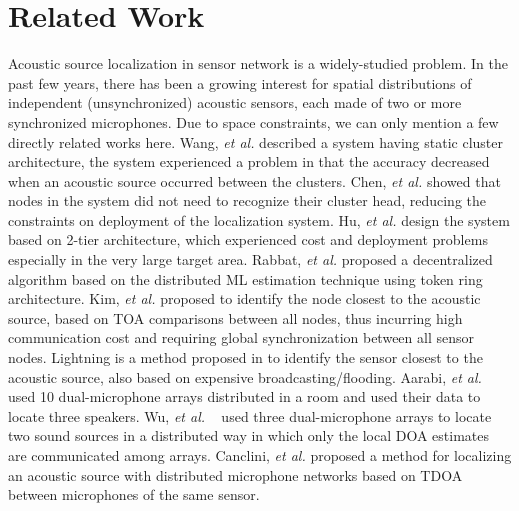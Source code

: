 \section{Related Work}

Acoustic source localization in sensor network is a widely-studied problem. 
In the past few years, there has been a growing interest for spatial distributions of independent (unsynchronized) acoustic sensors, each made of two or more synchronized microphones. Due to space constraints, we can only mention a few directly related works here.
Wang, \emph{et al.} \cite{wang2003acoustic} described a system having static cluster architecture, the system experienced a problem in that the accuracy decreased when an acoustic source occurred between the clusters.
Chen, \emph{et al.} \cite{chen2004dynamic} showed that nodes in the system did not need to recognize their cluster head, reducing the constraints on deployment of the localization system.
Hu, \emph{et al.} \cite{hu2009design} design the system based on 2-tier architecture, which experienced cost and deployment problems especially in the very large target area.
Rabbat, \emph{et al.} \cite{rabbat2005robust} proposed a decentralized algorithm based on the distributed ML estimation technique using token ring architecture.
Kim, \emph{et al.} \cite{kim2009locating}proposed to identify the node closest to the acoustic source, based on TOA comparisons between all nodes, thus incurring high communication cost and requiring global synchronization between all sensor nodes.
Lightning is a method proposed in \cite{wang2008lightning} to identify the sensor closest to the acoustic source, also based on expensive broadcasting/flooding.
Aarabi, \emph{et al.} ~\cite{aarabi1900fusion} used 10 dual-microphone arrays distributed in a room and used their data to locate three speakers.
Wu, \emph{et al.} ~\cite{wu2012fusion} used three dual-microphone arrays to locate two sound sources in a distributed way in which only the local DOA estimates are communicated among arrays.
Canclini, \emph{et al.}\cite{canclini2013acoustic,Canclini2015} proposed a method for localizing an acoustic source with distributed microphone networks based on TDOA between microphones of the same sensor.

